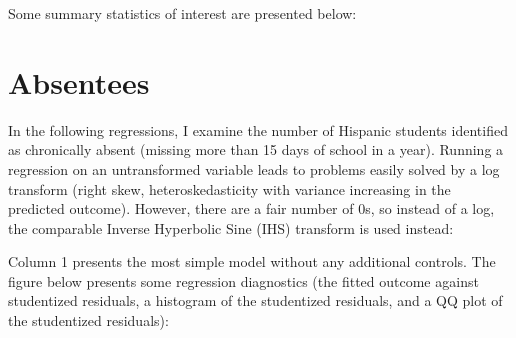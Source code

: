 \documentclass{article}
\begin{document}
Some summary statistics of interest are presented below:



\clearpage

\section*{Absentees}

In the following regressions, I examine the number of Hispanic students identified as chronically absent (missing more than 15 days of school in a year). Running a regression on an untransformed variable leads to problems easily solved by a log transform (right skew, heteroskedasticity with variance increasing in the predicted outcome). However, there are a fair number of 0s, so instead of a log, the comparable Inverse Hyperbolic Sine (IHS) transform is used instead:


\clearpage
Column 1 presents the most simple model without any additional controls. The figure below presents some regression diagnostics (the fitted outcome against studentized residuals, a histogram of the studentized residuals, and a QQ plot of the studentized residuals): 
\end{document}
